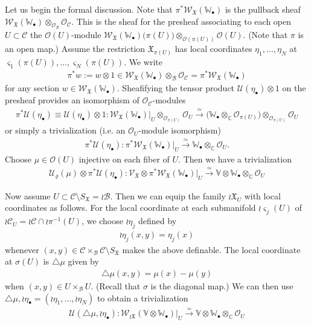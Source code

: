 \documentclass[12pt,a4paper,notitlepage]{article}
\theoremstyle{definition}
\theoremstyle{plain}
\newcommand{\fk}{\mathfrak}
\newcommand{\mc}{\mathcal}
\newcommand{\scr}{\mathscr}
\newcommand{\sgm}{\varsigma}
\newcommand{\SX}{{S_{\fk X}}}
\newcommand{\blt}{\bullet}
\newcommand{\Vbb}{\mathbb V}
\newcommand{\Wbb}{\mathbb W}
\newcommand{\Cbb}{\mathbb C}
\numberwithin{equation}{section}
\begin{document}
Let us begin the formal discussion. Note that $\pi^*\scr W_{\fk X}(\Wbb_\blt)$ is the pullback sheaf $\scr W_{\fk X}(\Wbb_\blt)\otimes_{\scr O_{\mc B}}\scr O_{\mc C}$. This is the sheaf for the presheaf associating to each open $U\subset\mc C$ the $\scr O(U)$-module $\scr W_{\fk X}(\Wbb_\blt)\big(\pi(U)\big)\otimes_{\scr O(\pi(U))}\scr O(U)$. (Note that $\pi$ is an open map.)  Assume the restriction $\fk X_{\pi(U)}$ has local coordinates $\eta_1,\dots,\eta_N$ at $\sgm_1(\pi(U)),\dots,\sgm_N(\pi(U))$. We write
\begin{align*}
\pi^* w:=w\otimes 1\in\scr W_{\fk X}(\Wbb_\blt)\otimes_{\mc B}\scr O_{\mc C}=\pi^*\scr W_{\fk X}(\Wbb_\blt)	
\end{align*}
for any section $w\in\scr W_{\fk X}(\Wbb_\blt)$. Sheafifying the tensor product $\mc U(\eta_\blt)\otimes 1$ on the presheaf provides an isomorphism of $\scr O_{\mc C}$-modules \index{Uzz@$\pi^*\mc U(\eta_\blt)$}
\begin{align}
\pi^*\mc U(\eta_\blt)\equiv \mc U(\eta_\blt)\otimes 1:\scr W_{\fk X}(\Wbb_\blt)\big|_U\otimes_{\scr O_{\pi(U)}}\scr O_U\xrightarrow{\simeq}\Big(\Wbb_\blt\otimes_\Cbb\scr O_{\pi(U)}\Big)\otimes_{\scr O_{\pi(U)}}\scr O_U\label{eq13}
\end{align}
or simply a trivialization (i.e. an $\scr O_U$-module isomorphism)
\begin{align}
\pi^*\mc U(\eta_\blt):\pi^*\scr W_{\fk X}(\Wbb_\blt)\big|_U\xrightarrow{\simeq}\Wbb_\blt\otimes_\Cbb\scr O_U.	
\end{align}
Choose $\mu\in\scr O(U)$ injective on each fiber of $U$. Then we have a trivialization
\begin{align}
\boxed{~\mc U_\varrho(\mu)\otimes\pi^*\mc U(\eta_\blt):	\scr V_{\fk X}\otimes\pi^*\scr W_{\fk X}(\Wbb_\blt)\big|_U\xrightarrow{\simeq}\Vbb\otimes\Wbb_\blt\otimes_\Cbb\scr O_U~}\label{eq16}
\end{align}




Now assume $U\subset\mc C\setminus\SX=\wr\mc B$. Then we can equip the family $\wr\fk X_U$ with local coordinates as follows. For the local coordinate at each submanifold $\wr\sgm_j(U)$ of $\wr\mc C_U=\wr\mc C\cap\wr\pi^{-1}(U)$, we choose $\wr\eta_j$ defined by 
\begin{gather}
\wr\eta_j(x,y)=\eta_j(x)
\end{gather}
whenever $(x,y)\in\mc C\times_{\mc B}\mc C\setminus\SX$ makes the above definable. The local coordinate at $\sigma(U)$ is $\triangle\mu$ given by  
\begin{align}
\triangle\mu(x,y)=\mu(x)-\mu(y)\label{eq9}
\end{align}
when $(x,y)\in U\times_{\mc B} U$. (Recall that $\sigma$ is the diagonal map.) We can then use $\triangle\mu,\wr\eta_\blt=(\wr\eta_1,\dots,\wr\eta_N)$ to obtain a trivialization
\begin{align}
\boxed{~\mc U(\triangle\mu,\wr\eta_\blt):\scr W_{\wr\fk X}(\Vbb\otimes\Wbb_\blt)|_U\xrightarrow{\simeq} \Vbb\otimes\Wbb_\blt\otimes_\Cbb\scr O_U~}\label{eq17}
\end{align}
\end{document}
